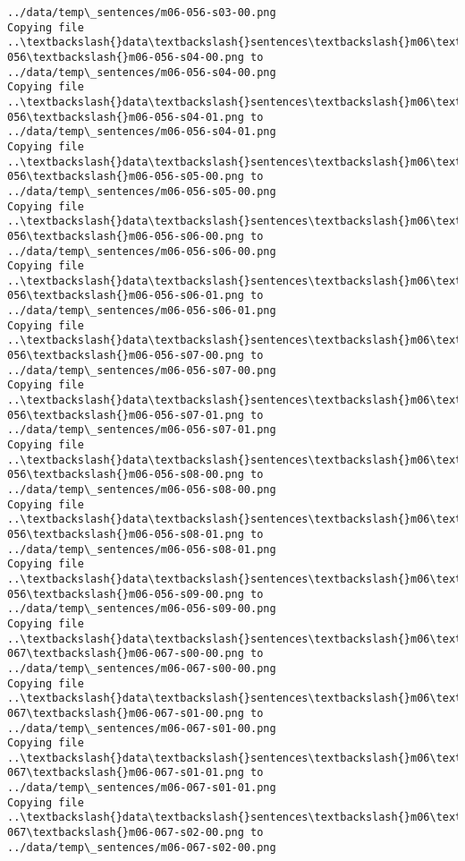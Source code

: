 \documentclass[11pt]{article}
\begin{document}
\begin{Verbatim}[commandchars=\\\{\}]
../data/temp\_sentences/m06-056-s03-00.png
Copying file ..\textbackslash{}data\textbackslash{}sentences\textbackslash{}m06\textbackslash{}m06-056\textbackslash{}m06-056-s04-00.png to
../data/temp\_sentences/m06-056-s04-00.png
Copying file ..\textbackslash{}data\textbackslash{}sentences\textbackslash{}m06\textbackslash{}m06-056\textbackslash{}m06-056-s04-01.png to
../data/temp\_sentences/m06-056-s04-01.png
Copying file ..\textbackslash{}data\textbackslash{}sentences\textbackslash{}m06\textbackslash{}m06-056\textbackslash{}m06-056-s05-00.png to
../data/temp\_sentences/m06-056-s05-00.png
Copying file ..\textbackslash{}data\textbackslash{}sentences\textbackslash{}m06\textbackslash{}m06-056\textbackslash{}m06-056-s06-00.png to
../data/temp\_sentences/m06-056-s06-00.png
Copying file ..\textbackslash{}data\textbackslash{}sentences\textbackslash{}m06\textbackslash{}m06-056\textbackslash{}m06-056-s06-01.png to
../data/temp\_sentences/m06-056-s06-01.png
Copying file ..\textbackslash{}data\textbackslash{}sentences\textbackslash{}m06\textbackslash{}m06-056\textbackslash{}m06-056-s07-00.png to
../data/temp\_sentences/m06-056-s07-00.png
Copying file ..\textbackslash{}data\textbackslash{}sentences\textbackslash{}m06\textbackslash{}m06-056\textbackslash{}m06-056-s07-01.png to
../data/temp\_sentences/m06-056-s07-01.png
Copying file ..\textbackslash{}data\textbackslash{}sentences\textbackslash{}m06\textbackslash{}m06-056\textbackslash{}m06-056-s08-00.png to
../data/temp\_sentences/m06-056-s08-00.png
Copying file ..\textbackslash{}data\textbackslash{}sentences\textbackslash{}m06\textbackslash{}m06-056\textbackslash{}m06-056-s08-01.png to
../data/temp\_sentences/m06-056-s08-01.png
Copying file ..\textbackslash{}data\textbackslash{}sentences\textbackslash{}m06\textbackslash{}m06-056\textbackslash{}m06-056-s09-00.png to
../data/temp\_sentences/m06-056-s09-00.png
Copying file ..\textbackslash{}data\textbackslash{}sentences\textbackslash{}m06\textbackslash{}m06-067\textbackslash{}m06-067-s00-00.png to
../data/temp\_sentences/m06-067-s00-00.png
Copying file ..\textbackslash{}data\textbackslash{}sentences\textbackslash{}m06\textbackslash{}m06-067\textbackslash{}m06-067-s01-00.png to
../data/temp\_sentences/m06-067-s01-00.png
Copying file ..\textbackslash{}data\textbackslash{}sentences\textbackslash{}m06\textbackslash{}m06-067\textbackslash{}m06-067-s01-01.png to
../data/temp\_sentences/m06-067-s01-01.png
Copying file ..\textbackslash{}data\textbackslash{}sentences\textbackslash{}m06\textbackslash{}m06-067\textbackslash{}m06-067-s02-00.png to
../data/temp\_sentences/m06-067-s02-00.png

\end{Verbatim}
\end{document}
